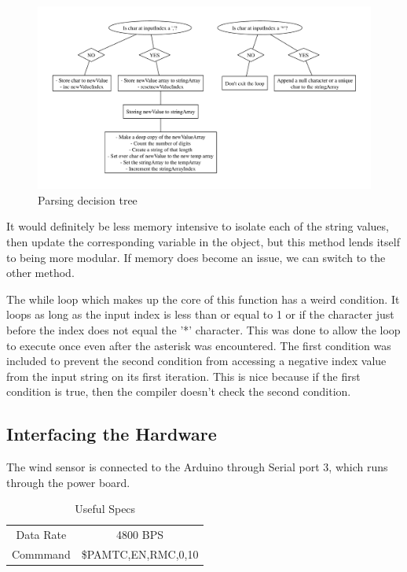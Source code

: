 \documentclass[letterpaper]{article}
\begin{document}
\begin{figure}[h]
	\centering
	\includegraphics[width=\linewidth]{maps/parsing.pdf}
	\caption{Parsing decision tree}
	\label{fig:parsingTree}
\end{figure}

It would definitely be less memory intensive to isolate each of the string values, then update the corresponding variable in the object, but this method lends itself to being more modular. If memory does become an issue, we can switch to the other method.

The while loop which makes up the core of this function has a weird condition. It loops as long as the input index is less than or equal to 1 or if the character just before the index does not equal the '*' character. This was done to allow the loop to execute once even after the asterisk was encountered. The first condition was included to prevent the second condition from accessing a negative index value from the input string on its first iteration. This is nice because if the first condition is true, then the compiler doesn't check the second condition.


\subsection{Interfacing the Hardware} %
\label{sub:Interfacing the Hardware}

The wind sensor is connected to the Arduino through Serial port 3, which runs through the power board.

\begin{table}[h]
	\centering
	\begin{tabular}{c|c}
		\hline
		Data Rate 	& 	4800 BPS 	\\
		Commmand 	& 	\$PAMTC,EN,RMC,0,10 \\
	\end{tabular}
	\caption{Useful Specs}
	\label{tbl:windspecs}
\end{table}
\end{document}
